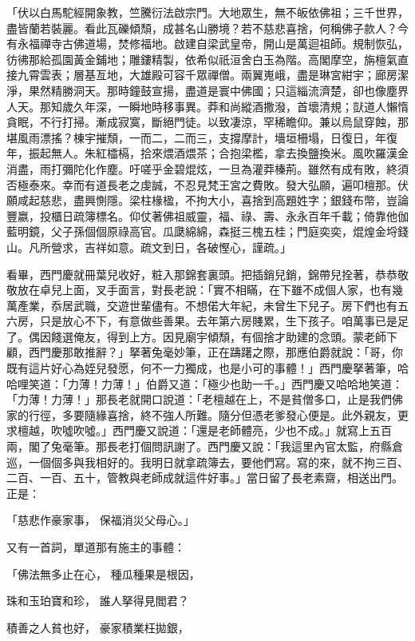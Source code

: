「伏以白馬駝經開象教，竺騰衍法啟宗門。大地眾生，無不皈依佛祖；三千世界，盡皆蘭若裝麗。看此瓦礫傾頹，成甚名山勝境？若不慈悲喜捨，何稱佛子款人？今有永福禪寺古佛道場，焚修福地。啟建自梁武皇帝，開山是萬迴祖師。規制恢弘，彷彿那給孤園黃金鋪地；雕鏤精製，依希似祇洹舍白玉為階。高閣摩空，旃檀氣直接九霄雲表；層基亙地，大雄殿可容千眾禪僧。兩翼嵬峨，盡是琳宮紺宇；廊房潔淨，果然精勝洞天。那時鐘鼓宣揚，盡道是寰中佛國；只這緇流濟楚，卻也像塵界人天。那知歲久年深，一瞬地時移事異。莽和尚縱酒撒潑，首壞清規；獃道人懶惰貪眠，不行打掃。漸成寂寞，斷絕門徒。以致凄涼，罕稀瞻仰。兼以烏鼠穿蝕，那堪風雨漂搖？棟宇摧頹，一而二，二而三，支撐摩計，墻垣柵塌，日復日，年復年，振起無人。朱紅櫺槅，拾來煨酒煨茶；合抱梁檻，拿去換鹽換米。風吹羅漢金消盡，雨打彌陀化作塵。吁嗟乎金碧焜炫，一旦為灌莽榛荊。雖然有成有敗，終須否極泰來。幸而有道長老之虔誠，不忍見梵王宮之費敗。發大弘願，遍叩檀那。伏願咸起慈悲，盡興惻隱。梁柱椽楹，不拘大小，喜捨到高題姓字；銀錢布幣，豈論豐嬴，投櫃日疏簿標名。仰仗著佛祖威靈，福、祿、壽、永永百年千載；倚靠他伽藍明鏡，父子孫個個原祿高官。瓜瓞綿綿，森挺三槐五桂；門庭奕奕，焜煌金埒錢山。凡所營求，吉祥如意。疏文到日，各破慳心，謹疏。」

看畢，西門慶就冊葉兒收好，粧入那錦套裏頭。把插銷兒銷，錦帶兒拴著，恭恭敬敬放在卓兒上面，叉手面言，對長老說：「實不相瞞，在下雖不成個人家，也有幾萬產業，忝居武職，交遊世輩儘有。不想偌大年紀，未曾生下兒子。房下們也有五六房，只是放心不下，有意做些善果。去年第六房賤累，生下孩子。咱萬事已是足了。偶因餞選俺友，得到上方。因見廟宇傾頹，有個捨才助建的念頭。蒙老師下顧，西門慶那敢推辭？」拏著兔毫妙筆，正在躊躇之際，那應伯爵就說：「哥，你既有這片好心為姪兒發愿，何不一力獨成，也是小可的事體！」西門慶拏著筆，哈哈哩笑道：「力薄！力薄！」伯爵又道：「極少也助一千。」西門慶又哈哈地笑道：「力薄！力薄！」那長老就開口說道：「老檀越在上，不是貧僧多口，止是我們佛家的行徑，多要隨緣喜捨，終不強人所難。隨分但憑老爹發心便是。此外親友，更求檀越，吹噓吹噓。」西門慶又說道：「還是老師體亮，少也不成。」就寫上五百兩，閣了兔毫筆。那長老打個問訊謝了。西門慶又說：「我這里內官太監，府縣倉巡，一個個多與我相好的。我明日就拿疏簿去，要他們寫。寫的來，就不拘三百、二百、一百、五十，管教與老師成就這件好事。」當日留了長老素齋，相送出門。正是：

「慈悲作豪家事，  保福消災父母心。」

又有一首詞，單道那有施主的事體：

「佛法無多止在心，  種瓜種果是根因，

珠和玉珀寶和珍，  誰人拏得見閻君？

積善之人貧也好，  豪家積業枉拋銀，

